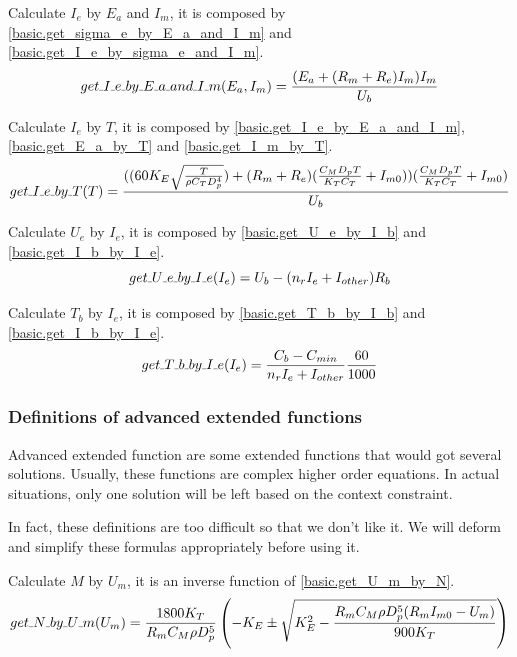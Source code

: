 \documentclass{article} %
\numberwithin{equation}{section} %
\newcommand{\SL}{\rule{.3em}{.3pt}} %
\begin{document}
Calculate $I_e$ by $E_a$ and $I_m$, it is composed by \eqref{basic.get_sigma_e_by_E_a_and_I_m} and \eqref{basic.get_I_e_by_sigma_e_and_I_m}.
\begin{equation}
get\SL I\SL e\SL by\SL E\SL a\SL and\SL I\SL m (E_a, I_m) = \frac{(E_a + (R_m + R_e) I_m) I_m}{U_b} \label{basic.get_I_e_by_E_a_and_I_m}
\end{equation}

Calculate $I_e$ by $T$, it is composed by \eqref{basic.get_I_e_by_E_a_and_I_m}, \eqref{basic.get_E_a_by_T} and \eqref{basic.get_I_m_by_T}.
\begin{equation}
get\SL I\SL e\SL by\SL T (T) = \frac{(({60} K_E \sqrt{\frac{T}{\rho C_T D_p^4}}) 
	+ (R_m + R_e) (\frac{C_M D_p T}{K_T C_T} + I_{m0})) (\frac{C_M D_p T}{K_T C_T} + I_{m0})}{U_b} \label{basic.get_I_e_by_T}
\end{equation}

Calculate $U_e$ by $I_e$, it is composed by \eqref{basic.get_U_e_by_I_b} and \eqref{basic.get_I_b_by_I_e}.
\begin{equation}
get\SL U\SL e\SL by\SL I\SL e (I_e) = U_b - (n_r I_e + I_{other}) R_b \label{basic.get_U_e_by_I_e}
\end{equation}

Calculate $T_b$ by $I_e$, it is composed by \eqref{basic.get_T_b_by_I_b} and \eqref{basic.get_I_b_by_I_e}.
\begin{equation}
get\SL T\SL b\SL by\SL I\SL e (I_e) = \frac{C_b - C_{min}}{n_r I_e + I_{other}} \frac{60}{1000} \label{basic.get_T_b_by_I_e}
\end{equation}

\subsubsection{Definitions of advanced extended functions}\label{main:basic:advanced_extended_functions}
Advanced extended function are some extended functions that would got several solutions.
Usually, these functions are complex higher order equations.
In actual situations, only one solution will be left based on the context constraint.

In fact, these definitions are too difficult so that we don't like it.
We will deform and simplify these formulas appropriately before using it.

Calculate $M$ by $U_m$, it is an inverse function of \eqref{basic.get_U_m_by_N}.
\begin{equation}
get\SL N\SL by\SL U\SL m (U_m) = \frac{1800 K_T}{R_m C_M \rho D_p^5}
	\left(-K_E\pm \sqrt{K_E^2 - \frac{R_m C_M \rho D_p^5 (R_m I_{m0} - U_m)}{900 K_T}} 
	\right) \label{basic.get_N_b_by_U_m}
\end{equation}
\end{document}
